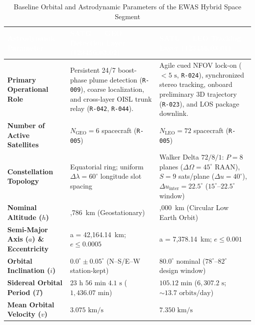 \documentclass[11pt,a4paper]{article}
\newcommand{\thead}[1]{\textcolor{white}{\textbf{\textsf{#1}}}}
\providecommand{\abbr}[1]{#1}
\begin{document}
\begin{table}[H]
\centering
\caption{Baseline Orbital and Astrodynamic Parameters of the EWAS Hybrid Space Segment}
\label{tab:sseg_orbital_params}
{\footnotesize\setlength{\tabcolsep}{4pt}\renewcommand{\arraystretch}{1.12}%
%
%
\noindent
\begin{tabularx}{\textwidth}{|>{\raggedright\arraybackslash}p{3.6cm}|>{\raggedright\arraybackslash}X|>{\raggedright\arraybackslash}X|}
    \hline
    \rowcolor{TableHeaderBlue}
    \thead{Astrodynamic Parameter} & \thead{SATG --- GEO Detection Layer (123456.03.02)} & \thead{SATL --- LEO Tracking Layer (123456.03.01)} \\ \hline
    \textbf{Primary Operational Role} & Persistent 24/7 boost-phase plume detection (\texttt{R-009}), coarse localization, and cross-layer \abbr{OISL} trunk relay (\texttt{R-042}, \texttt{R-044}). & Agile cued \abbr{NFOV} lock-on ($< 5\text{ s}$, \texttt{R-024}), synchronized stereo tracking, onboard preliminary 3D trajectory (\texttt{R-023}), and \abbr{LOS} package downlink. \\ \hline
    \textbf{Number of Active Satellites} & $N_{\text{GEO}} = 6$ spacecraft (\texttt{R-005}) & $N_{\text{LEO}} = 72$ spacecraft (\texttt{R-005}) \\ \hline
    \textbf{Constellation Topology} & Equatorial ring; uniform $\Delta\lambda = 60^\circ$ longitude slot spacing & Walker Delta $72/8/1$: $P = 8$ planes ($\Delta\Omega = 45^\circ$ RAAN), $S = 9$ sats/plane ($\Delta u = 40^\circ$), $\Delta u_{\text{inter}} = 22.5^\circ$ ($15^\circ\text{--}22.5^\circ$ window) \\ \hline
    \textbf{Nominal Altitude ($h$)} & 35,786~km (Geostationary) & 1,000~km (Circular Low Earth Orbit) \\ \hline
    \textbf{Semi-Major Axis ($a$) \& Eccentricity} & a = 42,164.14~km; $e \le 0.0005$ & a = 7,378.14~km; $e \le 0.001$ \\ \hline
    \textbf{Orbital Inclination ($i$)} & $0.0^\circ \pm 0.05^\circ$ (N--S/E--W station-kept) & $80.0^\circ$ nominal ($78^\circ\text{--}82^\circ$ design window) \\ \hline
    \textbf{Sidereal Orbital Period ($T$)} & $23\text{ h }56\text{ min }4.1\text{ s}$ ($1{,}436.07\text{ min}$) & $105.12\text{ min}$ ($6{,}307.2\text{ s}$; $\sim 13.7\text{ orbits/day}$) \\ \hline
    \textbf{Mean Orbital Velocity ($v$)} & $3.075\text{ km/s}$ & $7.350\text{ km/s}$ \\ \hline

\end{tabularx}}
\end{table}
\end{document}
